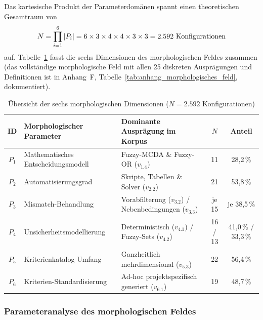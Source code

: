 Das kartesische Produkt der Parameterdomänen spannt einen theoretischen Gesamtraum von
\begin{equation}
  N = \prod_{i=1}^{6} |P_i| = 6 \times 3 \times 4 \times 4 \times 3 \times 3 = 2.592 \text{ Konfigurationen} \notag
\end{equation}
auf. Tabelle~\ref{tab:morphologisches_feld} fasst die sechs Dimensionen des morphologischen Feldes zusammen (das vollständige morphologische Feld mit allen 25 diskreten Ausprägungen und Definitionen ist in Anhang~F, Tabelle~\ref{tab:anhang_morphologisches_feld}, dokumentiert).

\begin{table}[htbp]
  \centering
  \small
  \caption{Übersicht der sechs morphologischen Dimensionen ($N = 2.592$ Konfigurationen)}
  \label{tab:morphologisches_feld}
  \begin{tabularx}{\textwidth}{cl>{\raggedright\arraybackslash}Xcc}
    \toprule
    \textbf{ID} & \textbf{Morphologischer Parameter} & \textbf{Dominante Ausprägung im Korpus} & \textbf{$N$} & \textbf{Anteil} \\
    \midrule
    $P_1$ & Mathematisches Entscheidungsmodell & Fuzzy-MCDA \& Fuzzy-OR ($v_{1.4}$) & 11 & 28,2\,\% \\
    $P_2$ & Automatisierungsgrad & Skripte, Tabellen \& Solver ($v_{2.2}$) & 21 & 53,8\,\% \\
    $P_3$ & Mismatch-Behandlung & Vorabfilterung ($v_{3.2}$) / Nebenbedingungen ($v_{3.3}$) & je 15 & je 38,5\,\% \\
    $P_4$ & Unsicherheitsmodellierung & Deterministisch ($v_{4.1}$) / Fuzzy-Sets ($v_{4.2}$) & 16 / 13 & 41,0\,\% / 33,3\,\% \\
    $P_5$ & Kriterienkatalog-Umfang & Ganzheitlich mehrdimensional ($v_{5.3}$) & 22 & 56,4\,\% \\
    $P_6$ & Kriterien-Standardisierung & Ad-hoc projektspezifisch generiert ($v_{6.1}$) & 19 & 48,7\,\% \\
    \bottomrule
  \end{tabularx}
\end{table}

\subsubsection{Parameteranalyse des morphologischen Feldes}
\label{subsubsec:parameteranalyse}

